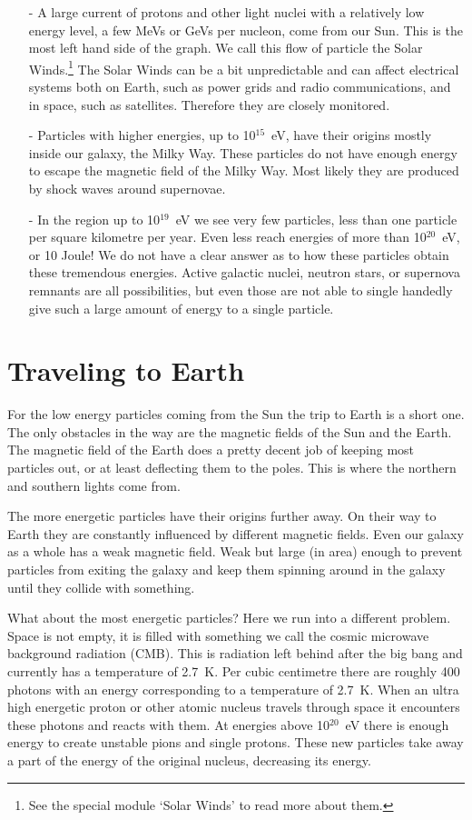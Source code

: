 \documentclass[12pt,a4paper]{article}
\numberwithin{equation}{section}
\numberwithin{figure}{section}
\numberwithin{table}{section}
\begin{document}
\begin{itemize}
\item[-] A large current of protons and other light nuclei with a relatively low energy level, a few MeVs or GeVs per nucleon, come from our Sun. This is the most left hand side of the graph. We call this flow of particle the Solar Winds.\footnote{See the special module `Solar Winds' to read more about them.} The Solar Winds can be a bit unpredictable and can affect electrical systems both on Earth, such as power grids and radio communications, and in space, such as satellites. Therefore they are closely monitored. 
\item[-] Particles with higher energies, up to 10$^{15}$~eV, have their origins mostly inside our galaxy, the Milky Way. These particles do not have enough energy to escape the magnetic field of the Milky Way. Most likely they are produced by shock waves around supernovae.
\item[-] In the region up to 10$^{19}$~eV we see very few particles, less than one particle per square kilometre per year. Even less reach energies of more than 10$^{20}$~eV, or 10 Joule! We do not have a clear answer as to how these particles obtain these tremendous energies. Active galactic nuclei, neutron stars, or supernova remnants are all possibilities, but even those are not able to single handedly give such a large amount of energy to a single particle.
\end{itemize}

\section{Traveling to Earth}
For the low energy particles coming from the Sun the trip to Earth is a short one. The only obstacles in the way are the magnetic fields of the Sun and the Earth. The magnetic field of the Earth does a pretty decent job of keeping most particles out, or at least deflecting them to the poles. This is where the northern and southern lights come from.

The more energetic particles have their origins further away. On their way to Earth they are constantly influenced by different magnetic fields. Even our galaxy as a whole has a weak magnetic field. Weak but large (in area) enough to prevent particles from exiting the galaxy and keep them spinning around in the galaxy until they collide with something.

What about the most energetic particles? Here we run into a different problem. Space is not empty, it is filled with something we call the cosmic microwave background radiation (CMB). This is radiation left behind after the big bang and currently has a temperature of 2.7~K. Per cubic centimetre there are roughly 400 photons with an energy corresponding to a temperature of 2.7~K. When an ultra high energetic proton or other atomic nucleus travels through space it encounters these photons and reacts with them. At energies above 10$^{20}$~eV  there is enough energy to create unstable pions and single protons. These new particles take away a part of the energy of the original nucleus, decreasing its energy.
\end{document}
